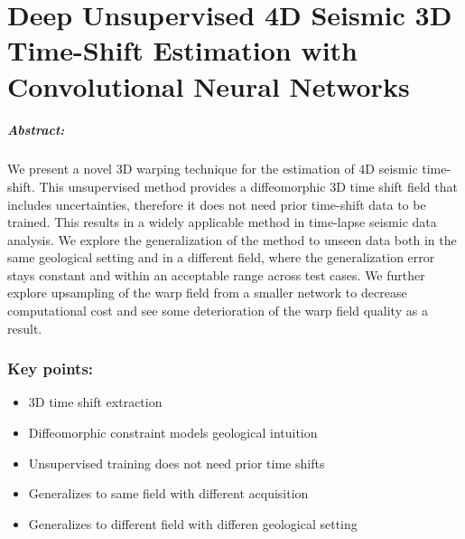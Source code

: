 

\chapter[Deep Convolutional Networks for 4D Time Shift Extraction]{Deep Unsupervised 4D Seismic 3D Time-Shift Estimation with Convolutional Neural Networks}
\label{sec:timeshift}

\paragraph{Abstract:} We present a novel 3D warping technique for the estimation of 4D seismic time-shift. This unsupervised method provides a diffeomorphic 3D time shift field that includes uncertainties, therefore it does not need prior time-shift data to be trained. This results in a widely applicable method in time-lapse seismic data analysis. We explore the generalization of the method to unseen data both in the same geological setting and in a different field, where the generalization error stays constant and within an acceptable range across test cases. We further explore upsampling of the warp field from a smaller network to decrease computational cost and see some deterioration of the warp field quality as a result.

\vfill
\subsection*{Key points:}
\begin{itemize}
    \item 3D time shift extraction
    \item Diffeomorphic constraint models geological intuition
    \item Unsupervised training does not need prior time shifts
    \item Generalizes to same field with different acquisition
    \item Generalizes to different field with differen geological setting
\end{itemize}
\vfill

{\vfill\hfill\newline{}}


